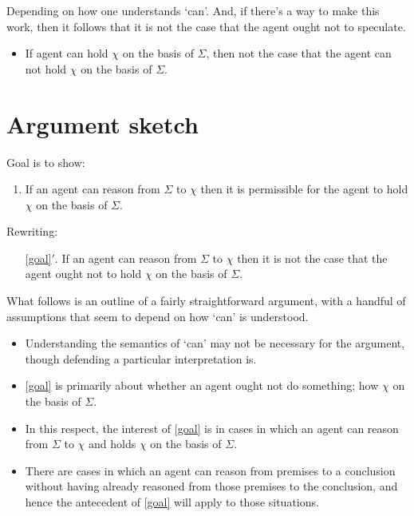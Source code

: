 \documentclass[10pt]{article}
\begin{document}
Depending on how one understands `can'.
And, if there's a way to make this work, then it follows that it is not the case that the agent ought not to speculate.

\begin{itemize}
\item If agent can hold \(\chi\) on the basis of \(\Sigma\), then not the case that the agent can not hold \(\chi\) on the basis of \(\Sigma\).
\end{itemize}

\newpage

\section{Argument sketch}
\label{sec:argument-sketch}

Goal is to show:
\begin{enumerate}[label=G\arabic*., ref=G\arabic*]
\item\label{goal} If an agent can reason from \(\Sigma\) to \(\chi\) then it is permissible for the agent to hold \(\chi\) on the basis of \(\Sigma\).
\end{enumerate}
Rewriting:
\begin{enumerate}
\item[\ref{goal}\('\).] If an agent can reason from \(\Sigma\) to \(\chi\) then it is not the case that the agent ought not to hold \(\chi\) on the basis of \(\Sigma\).
\end{enumerate}

What follows is an outline of a fairly straightforward argument, with a handful of assumptions that seem to depend on how `can' is understood.
\begin{itemize}
\item Understanding the semantics of `can' may not be necessary for the argument, though defending a particular interpretation is.
\end{itemize}

\begin{itemize}
\item \ref{goal} is primarily about whether an agent ought not do something; how \(\chi\) on the basis of \(\Sigma\).
\item In this respect, the interest of \ref{goal} is in cases in which an agent can reason from \(\Sigma\) to \(\chi\) and holds \(\chi\) on the basis of \(\Sigma\).
\item There are cases in which an agent can reason from premises to a conclusion without having already reasoned from those premises to the conclusion, and hence the antecedent of \ref{goal} will apply to those situations.
\end{itemize}
\end{document}
